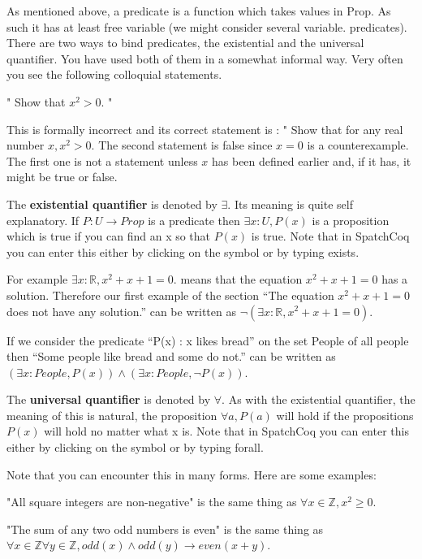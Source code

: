 As mentioned above, a predicate is a function which takes values in Prop. As such it has at least free variable (we might consider several variable. predicates). There are two ways to bind predicates,  the existential and the universal quantifier. You have used both of them in a somewhat informal way.
  Very often you see the following colloquial statements.
  
 " Show that $x^2 > 0$. "
  
  This is formally incorrect and its correct statement is : " Show that for any real number $x, x^2 > 0$.  
The second statement is false since $x=0$ is a counterexample. The first one is not a statement unless $x$ has been defined earlier and, if it has, it might be true or false.

  
  
The  {\bf existential quantifier} is denoted by $\exists$. Its meaning  is quite self explanatory. If $P:U \rightarrow Prop$ is a predicate then $\exists x:U, P(x)$ is a proposition which is true if you can find an x so that $P(x)$ is true. Note that in SpatchCoq you can enter this either by clicking on the symbol or by typing exists.


For example $\exists x:\mathbb{R}, x^{2}+x+1 =0.$ means that the equation $x^{2}+x+1=0$ has a solution. Therefore our first example of the section ``The equation $x^2+x+1=0$ does not have any solution.'' can be written as $\neg (\exists x:\mathbb{R}, x^{2}+x+1 =0).$ 

If we consider the predicate ``P(x) : x likes bread'' on the set People of all people then ``Some people like bread and some do not.'' can be written as $(\exists x:People, P(x))\land (\exists x:People, \neg P(x))$.

The {\bf universal quantifier} is denoted by $\forall$. As with the existential quantifier, the meaning of this is natural, the proposition $\forall a, P(a)$ will hold if  the propositions $P(x)$ will hold no matter what x is. 
Note that in SpatchCoq you can enter this either by clicking on the symbol or by typing forall.

Note that you can encounter this in many forms.  Here are some examples:

"All square integers are non-negative" is the same thing as $\forall x \in \mathbb{Z}, x^2\ge 0$.

"The sum of any two odd numbers is even" is the same thing as $\forall x  \in \mathbb{Z} \forall y \in  \mathbb{Z} ,  odd(x) \land odd(y) \rightarrow even(x+y)$.


